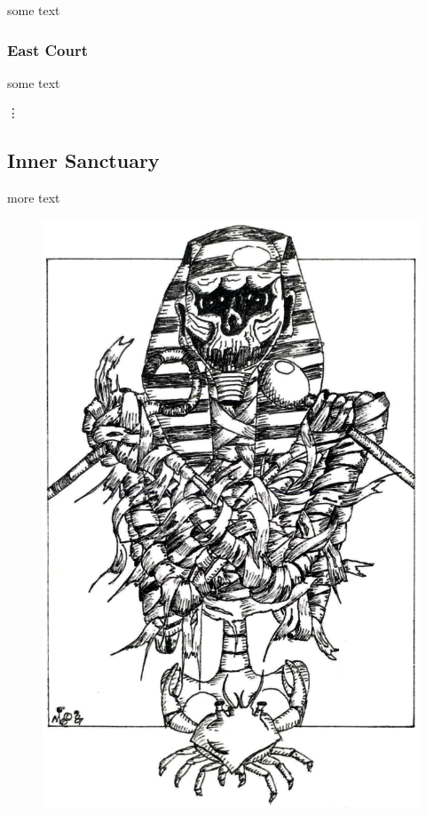 \documentclass[a4paper,serif]{module}
\begin{document}
some text

\subsubsection{East Court}                                                      %

some text

\vdots
\setcounter{subsection}{13}                                                     %

\subsection{Inner Sanctuary}                                                    %
\label{inner_sanctuary}

more text

\begin{figure}[ht]
\includegraphics[width=\columnwidth]{module_art_interior.png}
\label{img:tomb}
\end{figure}
\end{document}
